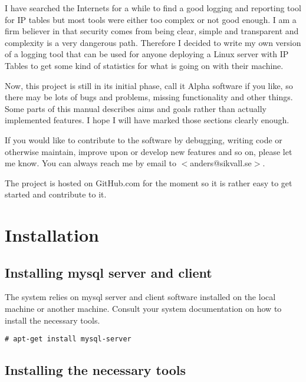 \documentclass[english,twoside,openright,a4paper,12pt]{report}
\begin{document}
I have searched the Internets for a while to find a good logging and reporting tool for IP tables but most tools were either too complex or not good enough. I am a firm believer in that security comes from being clear, simple and transparent and complexity is a very dangerous path. Therefore I decided to write my own version of a logging tool that can be used for anyone deploying a Linux server with IP Tables to get some kind of statistics for what is going on with their machine. 
 
Now, this project is still in its initial phase, call it Alpha software if you like, so there may be lots of bugs and problems, missing functionality and other things. Some parts of this manual describes aims and goals rather than actually implemented features. I hope I will have marked those sections clearly enough. 

If you would like to contribute to the software by debugging, writing code or otherwise maintain, improve upon or develop new features and so on, please let me know. You can always reach me by email to 
$<$anders@sikvall.se$>$.

The project is hosted on GitHub.com for the moment so it is rather easy to get started and contribute to it.







\chapter{Installation}

\section{Installing mysql server and client}

The system relies on mysql server and client software installed on the local machine or another machine. Consult your system documentation on how to install the necessary tools.

\begin{verbatim}
# apt-get install mysql-server
\end{verbatim}

\section{Installing the necessary tools}
\end{document}
